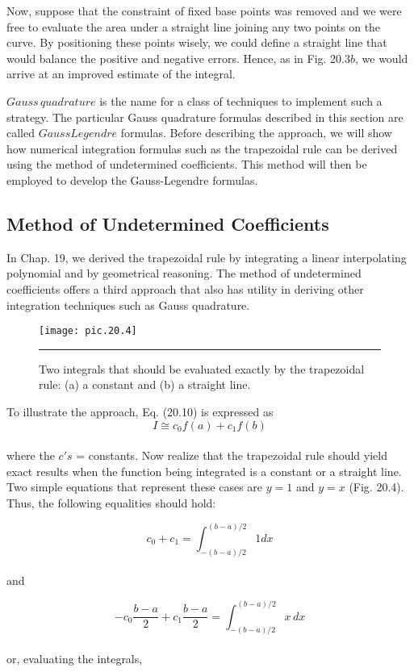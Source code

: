 \documentclass[../main.tex]{subfiles}
\begin{document}
Now, suppose that the constraint of fixed base points was removed and we were free to
evaluate the area under a straight line joining any two points on the curve. By positioning
these points wisely, we could define a straight line that would balance the positive and negative errors. Hence, as in Fig. 20.3$b$, we would arrive at an improved estimate of the integral.

$Gauss\, quadrature$ is the name for a class of techniques to implement such a strategy.
The particular Gauss quadrature formulas described in this section are called $GaussLegendre$ formulas. Before describing the approach, we will show how numerical integration formulas such as the trapezoidal rule can be derived using the method of undetermined
coefficients. This method will then be employed to develop the Gauss-Legendre formulas.


\subsection{Method of Undetermined Coefficients}
In Chap. 19, we derived the trapezoidal rule by integrating a linear interpolating polynomial
and by geometrical reasoning. The method of undetermined coefficients offers a third approach that also has utility in deriving other integration techniques such as Gauss quadrature.\\
\begin{figure}[hbt!]
	\centering
	\texttt{[image: pic.20.4]}
	\caption{\textsf{Two integrals that should be evaluated exactly by the trapezoidal rule: (a) a constant and 
(b) a straight line.}} \hrule
	\label{pic.20.4}
\end{figure}

To illustrate the approach, Eq. (20.10) is expressed as
\begin{equation}
	\tag{20.11}
	I\cong c_0 f(a) + c_1 f(b)
\end{equation}\\
where the $c's$ = constants. Now realize that the trapezoidal rule should yield exact results
when the function being integrated is a constant or a straight line. Two simple equations
that represent these cases are $y = 1$ and $y = x$ (Fig. 20.4). Thus, the following equalities
should hold:

	$$c_0 + c_1 = \int^{(b-a)/2}_{-(b-a)/2} 1dx$$\\
and

	$$-c_0 \dfrac{b-a}{2}+c_1 \dfrac{b-a}{2} = \int^{(b-a)/2}_{-(b-a)/2} x\, dx$$\\
or, evaluating the integrals,
\end{document}
